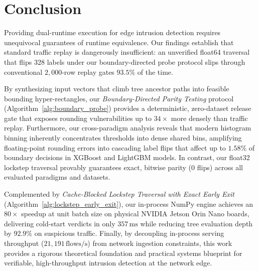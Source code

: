 \section{Conclusion}
\label{sec:conclusion}

Providing dual-runtime execution for edge intrusion detection requires unequivocal guarantees of runtime equivalence. Our findings establish that standard traffic replay is dangerously insufficient: an unverified float64 traversal that flips 328 labels under our boundary-directed probe protocol slips through conventional $2{,}000$-row replay gates $93.5\%$ of the time. 

By synthesizing input vectors that climb tree ancestor paths into feasible bounding hyper-rectangles, our \emph{Boundary-Directed Parity Testing} protocol (Algorithm~\ref{alg:boundary_probe}) provides a deterministic, zero-dataset release gate that exposes rounding vulnerabilities up to $34\times$ more densely than traffic replay. Furthermore, our cross-paradigm analysis reveals that modern histogram binning inherently concentrates thresholds into dense shared bins, amplifying floating-point rounding errors into cascading label flips that affect up to $1.58\%$ of boundary decisions in XGBoost and LightGBM models. In contrast, our float32 lockstep traversal provably guarantees exact, bitwise parity ($0$ flips) across all evaluated paradigms and datasets.

Complemented by \emph{Cache-Blocked Lockstep Traversal with Exact Early Exit} (Algorithm~\ref{alg:lockstep_early_exit}), our in-process NumPy engine achieves an $80\times$ speedup at unit batch size on physical NVIDIA Jetson Orin Nano boards, delivering cold-start verdicts in only $357\,\text{ms}$ while reducing tree evaluation depth by $92.9\%$ on suspicious traffic. Finally, by decoupling in-process serving throughput ($21{,}191\,\text{flows/s}$) from network ingestion constraints, this work provides a rigorous theoretical foundation and practical systems blueprint for verifiable, high-throughput intrusion detection at the network edge.
